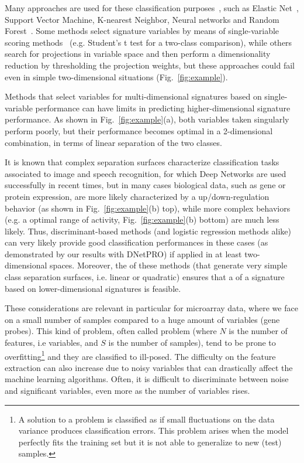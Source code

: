 \documentclass{standalone}
\begin{document}
Many approaches are used for these classification purposes~\cite{Guyon2002}, such as Elastic Net~\cite{Hughey2015}, Support Vector Machine, K-nearest Neighbor, Neural networks and Random Forest~\cite{Pang2012}.
Some methods select signature variables by means of single-variable scoring methods~\cite{Eckhard2012, Hocking1976} (e.g. Student's t test for a two-class comparison), while others search for projections in variable space and then perform a dimensionality reduction by thresholding the projection weights, but these approaches could fail even in simple two-dimensional situations (Fig.~\ref{fig:example}).

Methods that select variables for multi-dimensional signatures based on single-variable performance can have limits in predicting higher-dimensional signature performance.
As shown in Fig.~\ref{fig:example}(a), both variables taken singularly perform poorly, but their performance becomes optimal in a 2-dimensional combination, in terms of linear separation of the two classes.

It is known that complex separation surfaces characterize classification tasks associated to image and speech recognition, for which Deep Networks are used successfully in recent times, but in many cases biological data, such as gene or protein expression, are more likely characterized by a up/down-regulation behavior (as shown in Fig.~\ref{fig:example}(b) top), while more complex behaviors (e.g. a  optimal range of activity, Fig.~\ref{fig:example}(b) bottom) are much less likely.
Thus, discriminant-based methods (and logistic regression methods alike) can very likely provide good classification performances in these cases (as demonstrated by our results with DNetPRO) if applied in at least two-dimensional spaces.
Moreover, the  of these methods (that generate very simple class separation surfaces, i.e. linear or quadratic) ensures that a  of a signature based on lower-dimensional signatures is feasible.

These considerations are relevant in particular for microarray data, where we face on a small number of samples compared to a huge amount of variables (gene probes).
This kind of problem, often called  problem (where $N$ is the number of features, i.e variables, and $S$ is the number of samples), tend to be prone to overfitting\footnote{
  A solution to a problem is classified as  if small fluctuations on the data variance produces classification errors.
  This problem arises when the model perfectly fits the training set but it is not able to generalize to new (test) samples.
} and they are classified to ill-posed.
The difficulty on the feature extraction can also increase due to noisy variables that can drastically affect the machine learning algorithms.
Often, it is difficult to discriminate between noise and significant variables, even more as the number of variables rises.
\end{document}
